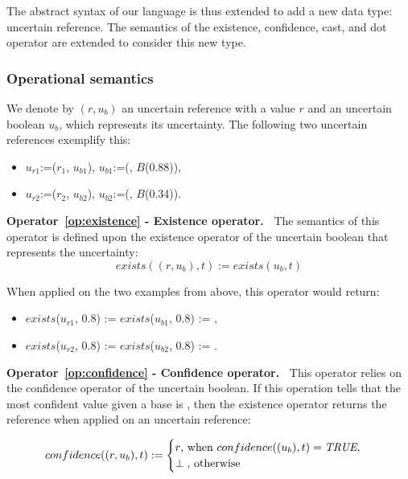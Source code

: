 The abstract syntax of our language is thus extended to add a new data type: uncertain reference.
The semantics of the existence, confidence, cast, and dot operator are extended to consider this new type.

\subsubsection{Operational semantics}
We denote by $(r, u_b)$ an uncertain reference with a value $r$ and an uncertain boolean $u_b$, which represents its uncertainty.
The following two uncertain references exemplify this:
\begin{itemize}
    \item $u_{r1}$:=($r_1$, $u_{b1}$), $u_{b1}$:=(\true{}, $B$(0.88)),
    \item $u_{r2}$:=($r_2$, $u_{b2}$), $u_{b2}$:=(\true{}, $B$(0.34)).
\end{itemize}

\bigskip

\noindent\textbf{Operator~\ref{op:existence} - Existence operator.~}
The semantics of this operator is defined upon the existence operator of the uncertain boolean that represents the uncertainty:
\[exists((r, u_b), t) := exists(u_b, t)\]

When applied on the two examples from above, this operator would return:
\begin{itemize}
    \item $exists$($u_{r1}$, 0.8) := $exists$($u_{b1}$, 0.8) := \true{},
    \item $exists$($u_{r2}$, 0.8) := $exists$($u_{b2}$, 0.8) := \false{}.
\end{itemize}

\noindent\textbf{Operator~\ref{op:confidence} - Confidence operator.~}
This operator relies on the confidence operator of the uncertain boolean.
If this operation tells that the most confident value given a base is \true{}, then the existence operator returns the reference when applied on an uncertain reference:
 
\[confidence((r,u_b), t) := \begin{cases}
                                                r \text{, when } confidence((u_b), t) = \textit{TRUE}{}, \\
                                                \perp \text{, otherwise}
                                            \end{cases}\]
                                           
